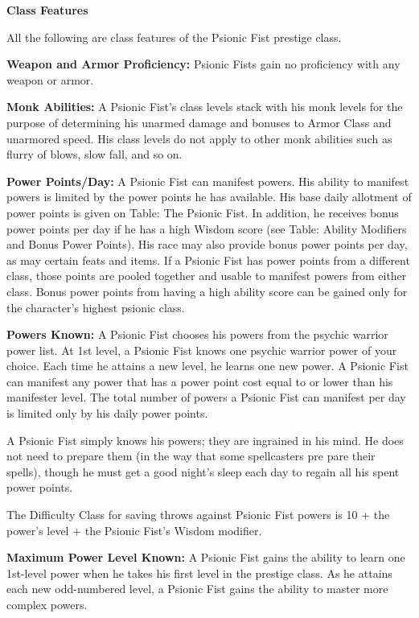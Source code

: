 \documentclass{article}
\begin{document}
\vspace{12pt}
\textbf{Class Features}

All the following are class features of the Psionic Fist prestige class.

\textbf{Weapon and Armor Proficiency:} Psionic Fists gain no proficiency with any 
weapon or armor.

\textbf{Monk Abilities:} A Psionic Fist's class levels stack with his monk levels 
for the purpose of determining his unarmed damage and bonuses to Armor Class and 
unarmored speed. His class levels do not apply to other monk abilities such as 
flurry of blows, slow fall, and so on.

\textbf{Power Points/Day:} A Psionic Fist can manifest powers. His ability to manifest 
powers is limited by the power points he has available. His base daily allotment 
of power points is given on Table: The Psionic Fist. In addition, he receives bonus 
power points per day if he has a high Wisdom score (see Table: Ability Modifiers 
and Bonus Power Points). His race may also provide bonus power points per day, 
as may certain feats and items. If a Psionic Fist has power points from a different 
class, those points are pooled together and usable to manifest powers from either 
class. Bonus power points from having a high ability score can be gained only for 
the character's highest psionic class.

\textbf{Powers Known: }A Psionic Fist chooses his powers from the psychic warrior 
power list. At 1st level, a Psionic Fist knows one psychic warrior power of your 
choice. Each time he attains a new level, he learns one new power. A Psionic Fist 
can manifest any power that has a power point cost equal to or lower than his manifester 
level. The total number of powers a Psionic Fist can manifest per day is limited 
only by his daily power points.

A Psionic Fist simply knows his powers; they are ingrained in his mind. He does 
not need to prepare them (in the way that some spellcasters pre pare their spells), 
though he must get a good night's sleep each day to regain all his spent power 
points.

The Difficulty Class for saving throws against Psionic Fist powers is 10 + the 
power's level + the Psionic Fist's Wisdom modifier.

\textbf{Maximum Power Level Known: }A Psionic Fist gains the ability to learn one 
1st-level power when he takes his first level in the prestige class. As he attains 
each new odd-numbered level, a Psionic Fist gains the ability to master more complex 
powers.
\end{document}
